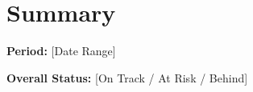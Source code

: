 \section{Summary}


\textbf{Period:} [Date Range]

\textbf{Overall Status:} [On Track / At Risk / Behind]

